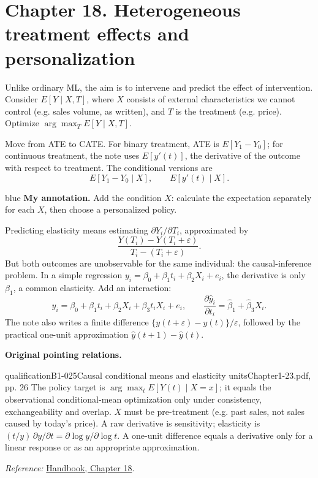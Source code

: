 {\section{Chapter 18. Heterogeneous treatment effects and personalization}
Unlike ordinary ML, the aim is to intervene and predict the effect of intervention. Consider $E[Y\mid X,T]$, where $X$ consists of external characteristics we cannot control (e.g. sales volume, as written), and $T$ is the treatment (e.g. price). Optimize $\arg\max_T E[Y\mid X,T]$.

Move from ATE to CATE. For binary treatment, ATE is $E[Y_1-Y_0]$; for continuous treatment, the note uses $E[y'(t)]$, the derivative of the outcome with respect to treatment. The conditional versions are
\[E[Y_1-Y_0\mid X],\qquad E[y'(t)\mid X].\]
\begin{inkblock}{blue}
\textbf{My annotation.} Add the condition $X$: calculate the expectation separately for each $X$, then choose a personalized policy.
\end{inkblock}

Predicting elasticity means estimating $\partial Y_i/\partial T_i$, approximated by
\[\frac{Y(T_i)-Y(T_i+\varepsilon)}{T_i-(T_i+\varepsilon)}.\]
But both outcomes are unobservable for the same individual: the causal-inference problem. In a simple regression $y_i=\beta_0+\beta_1t_i+\beta_2X_i+e_i$, the derivative is only $\beta_1$, a common elasticity. Add an interaction:
\[y_i=\beta_0+\beta_1t_i+\beta_2X_i+\beta_3t_iX_i+e_i,
\qquad \frac{\partial\hat y_i}{\partial t_i}=\hat\beta_1+\hat\beta_3X_i.
\]
  The note also writes a finite difference $\{y(t+\varepsilon)-y(t)\}/\varepsilon$, followed by the practical one-unit approximation $\hat y(t+1)-\hat y(t)$.

\par{}\smallskip\textbf{Original pointing relations.}\par\smallskip
{}
\begin{reviewnote}{qualification}{B1-025}{Causal conditional means and elasticity units}{Chapter1-23.pdf, pp. 26}
The policy target is $\arg\max_t E[Y(t)\mid X=x]$; it equals the observational conditional-mean optimization only under consistency, exchangeability and overlap. $X$ must be pre-treatment (e.g. past sales, not sales caused by today's price). A raw derivative is sensitivity; elasticity is $(t/y)\,\partial y/\partial t=\partial\log y/\partial\log t$. A one-unit difference equals a derivative only for a linear response or as an appropriate approximation.
\par\smallskip\textit{Reference:} \href{https://matheusfacure.github.io/python-causality-handbook/18-Heterogeneous-Treatment-Effects-and-Personalization.html}{Handbook, Chapter 18}.
\end{reviewnote}
}
